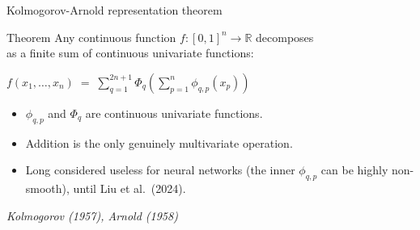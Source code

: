 \documentclass[aspectratio=169, t]{beamer}
\begin{document}
\begin{frame}{Kolmogorov-Arnold representation theorem}

\vspace{-0.6em}

{
\begin{block}{Theorem}
\centering
Any continuous function $f : [0,1]^n \to \mathbb{R}$ decomposes \\
as a finite sum of continuous univariate functions:

\vspace{0.6em}

{\large
$\displaystyle f(x_1, \ldots, x_n) \;=\; \sum_{q=1}^{2n+1} \Phi_q\!\left( \sum_{p=1}^{n} \phi_{q,p}(x_p) \right)$
}
\end{block}
}

\vspace{0.5em}

\begin{itemize}
  \item $\phi_{q,p}$ and $\Phi_q$ are continuous univariate functions.
  \item Addition is the only genuinely multivariate operation.
  \item Long considered useless for neural networks (the inner $\phi_{q,p}$ can be highly non-smooth), until Liu et al.\ (2024).
\end{itemize}

\vfill
\hfill {\scriptsize\itshape\color{gray} Kolmogorov (1957), Arnold (1958)}

\end{frame}
\end{document}
